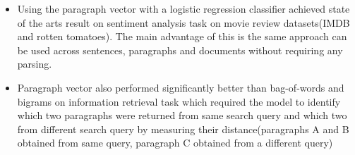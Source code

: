 \documentclass{article}
\begin{document}
\begin{itemize}
    \item Using the paragraph vector with a logistic regression classifier achieved state of the arts result on sentiment analysis task on movie review datasets(IMDB and rotten tomatoes). The main advantage of this is the same approach can be used across sentences, paragraphs and documents without requiring any parsing.
    \item Paragraph vector also performed significantly better than bag-of-words and bigrams on information retrieval task which required the model to identify which two paragraphs were returned from same search query and which two from different search query by measuring their distance(paragraphs A and B obtained from same query, paragraph C obtained from a different query)
\end{itemize}
\end{document}
